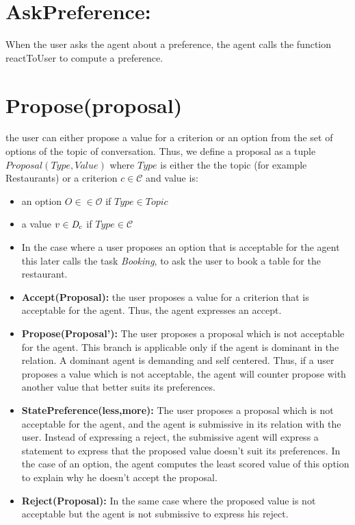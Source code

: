 \documentclass{llncs}
\begin{document}
%

\section{AskPreference: } 
		When the user asks the agent about a preference, the agent calls the function reactToUser to compute a preference.
		
\section{Propose(proposal)}
	the user can either propose a value for a criterion or an option from the set of options of the topic of conversation. Thus, we define a proposal as a tuple $Proposal(Type, Value)$ where  $Type$ is either the the topic (for example Restaurants) or a criterion $c \in \mathcal{C}$ and value is:
	\begin{itemize}
		\item an option $O \in \in \mathcal{O}$ if $Type \in Topic$ 
		\item a value $v \in \emph{D}_c$ if $Type \in \mathcal{C}$
	\end{itemize}
	   
\begin{itemize}
	\item In the case where a user proposes an option that is acceptable for the agent this later calls the task \textit{Booking}, to ask the user to book a table for the restaurant. 
	\item \textbf{Accept(Proposal):} the user proposes a value for a criterion that is acceptable for the agent. Thus, the agent expresses an accept.
	\item \textbf{Propose(Proposal'):} The user proposes a proposal which is not acceptable for the agent. This branch is applicable only if the agent is dominant in the relation. A dominant agent is demanding and self centered. Thus, if a user proposes a value which is not acceptable, the agent will counter propose with another value that better suits its preferences.
	\item \textbf{StatePreference(less,more):} The user proposes a proposal which is not acceptable for the agent, and the agent is submissive in its relation with the user. Instead of expressing a reject, the submissive agent will express a statement to express that the proposed value doesn't suit its preferences.
	In the case of an option, the agent computes the least scored value of this option to explain why he doesn't accept the proposal.
	\item\textbf{Reject(Proposal):} In the same case where the proposed value is not acceptable but the agent is not submissive to express his reject.
		
\end{itemize}
\end{document}
